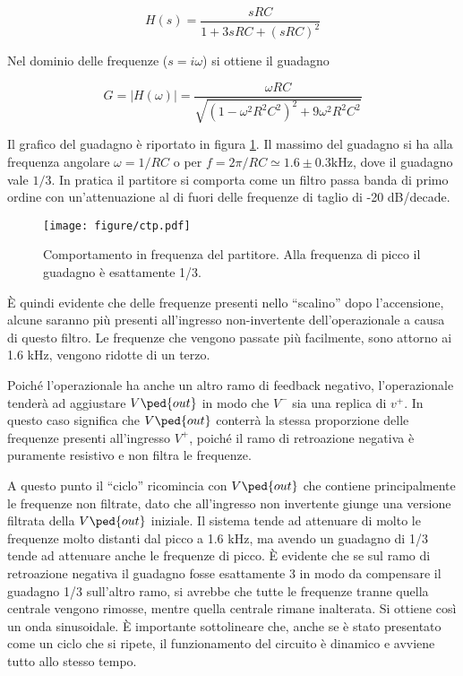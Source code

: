 \begin{equation}
    H(s) = \frac{sRC}{1 + 3sRC + (sRC)^2}
\end{equation}

Nel dominio delle frequenze ($s = i\omega$) si ottiene il guadagno

\begin{equation}
    G = |H(\omega)| = \frac{\omega RC}{\sqrt{(1 - \omega^2R^2C^2)^2 + 9\omega^2R^2C^2}}
\end{equation}

Il grafico del guadagno è riportato in figura \ref{fig:partitore8}. Il massimo del guadagno si ha alla frequenza
angolare $\omega = 1/RC$ o per $f = 2\pi/RC \simeq 1.6 \pm 0.3 \si{\kilo\hertz}$, dove il guadagno vale $1/3$. In pratica il partitore
si comporta come un filtro passa banda di primo ordine con un'attenuazione al di fuori delle frequenze di taglio
di -20 dB/decade.

\begin{figure}
    \centering
    \texttt{[image: figure/ctp.pdf]}
    \caption{Comportamento in frequenza del partitore. Alla frequenza di picco il guadagno è esattamente 1/3.}
    \label{fig:partitore8}
\end{figure}

È quindi evidente che delle frequenze presenti nello ``scalino'' dopo l'accensione, alcune saranno più presenti
all'ingresso non-invertente dell'operazionale a causa di questo filtro. Le frequenze che vengono passate più facilmente,
sono attorno ai 1.6 kHz, vengono ridotte di un terzo.

Poiché l'operazionale ha anche un altro ramo di feedback negativo, l'operazionale tenderà ad aggiustare $V\ped{out}$
in modo che $V^-$ sia una replica di $v^+$. In questo caso significa che $V\ped{out}$ conterrà la stessa proporzione
delle frequenze presenti all'ingresso $V^+$, poiché il ramo di retroazione negativa è puramente resistivo e non filtra
le frequenze.

A questo punto il ``ciclo'' ricomincia con $V\ped{out}$ che contiene principalmente le frequenze non filtrate,
dato che all'ingresso non invertente giunge una versione filtrata della $V\ped{out}$ iniziale.
Il sistema tende ad attenuare di molto le frequenze molto distanti dal picco a 1.6 kHz, ma avendo un guadagno di 1/3 tende
ad attenuare anche le frequenze di picco. È evidente che se sul ramo di retroazione negativa il guadagno fosse esattamente 3
in modo da compensare il guadagno 1/3 sull'altro ramo,
si avrebbe che tutte le frequenze tranne quella centrale vengono rimosse, mentre quella centrale rimane inalterata.
Si ottiene così un onda sinusoidale. È importante sottolineare che, anche se è stato presentato come un ciclo che si ripete,
il funzionamento del circuito è dinamico e avviene tutto allo stesso tempo.

